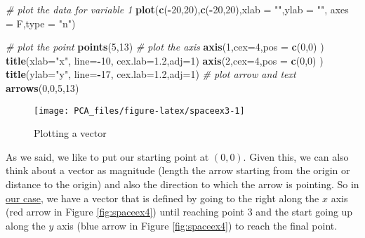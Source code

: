 \documentclass[
]{book}
\newenvironment{Shaded}{\begin{snugshade}}{\end{snugshade}}
\newcommand{\CommentTok}[1]{\textcolor[rgb]{0.56,0.35,0.01}{\textit{#1}}}
\newcommand{\DataTypeTok}[1]{\textcolor[rgb]{0.13,0.29,0.53}{#1}}
\newcommand{\DecValTok}[1]{\textcolor[rgb]{0.00,0.00,0.81}{#1}}
\newcommand{\FloatTok}[1]{\textcolor[rgb]{0.00,0.00,0.81}{#1}}
\newcommand{\KeywordTok}[1]{\textcolor[rgb]{0.13,0.29,0.53}{\textbf{#1}}}
\newcommand{\NormalTok}[1]{#1}
\newcommand{\OperatorTok}[1]{\textcolor[rgb]{0.81,0.36,0.00}{\textbf{#1}}}
\newcommand{\StringTok}[1]{\textcolor[rgb]{0.31,0.60,0.02}{#1}}
\theoremstyle{definition}
\theoremstyle{definition}
\theoremstyle{definition}
\theoremstyle{remark}
\begin{document}
\begin{Shaded}
\begin{Highlighting}[]
\CommentTok{# plot the data for variable 1}
\KeywordTok{plot}\NormalTok{(}\KeywordTok{c}\NormalTok{(}\OperatorTok{-}\DecValTok{20}\NormalTok{,}\DecValTok{20}\NormalTok{),}\KeywordTok{c}\NormalTok{(}\OperatorTok{-}\DecValTok{20}\NormalTok{,}\DecValTok{20}\NormalTok{),}\DataTypeTok{xlab =} \StringTok{""}\NormalTok{,}\DataTypeTok{ylab =} \StringTok{""}\NormalTok{,}
 \DataTypeTok{axes =}\NormalTok{ F,}\DataTypeTok{type =} \StringTok{"n"}\NormalTok{)}

\CommentTok{# plot the point}
\KeywordTok{points}\NormalTok{(}\DecValTok{5}\NormalTok{,}\DecValTok{13}\NormalTok{)}
\CommentTok{# plot the axis}
\KeywordTok{axis}\NormalTok{(}\DecValTok{1}\NormalTok{,}\DataTypeTok{cex=}\DecValTok{4}\NormalTok{,}\DataTypeTok{pos =} \KeywordTok{c}\NormalTok{(}\DecValTok{0}\NormalTok{,}\DecValTok{0}\NormalTok{) )}
\KeywordTok{title}\NormalTok{(}\DataTypeTok{xlab=}\StringTok{"x"}\NormalTok{, }\DataTypeTok{line=}\OperatorTok{-}\DecValTok{10}\NormalTok{, }\DataTypeTok{cex.lab=}\FloatTok{1.2}\NormalTok{,}\DataTypeTok{adj=}\DecValTok{1}\NormalTok{)}
\KeywordTok{axis}\NormalTok{(}\DecValTok{2}\NormalTok{,}\DataTypeTok{cex=}\DecValTok{4}\NormalTok{,}\DataTypeTok{pos =} \KeywordTok{c}\NormalTok{(}\DecValTok{0}\NormalTok{,}\DecValTok{0}\NormalTok{) )}
\KeywordTok{title}\NormalTok{(}\DataTypeTok{ylab=}\StringTok{"y"}\NormalTok{, }\DataTypeTok{line=}\OperatorTok{-}\DecValTok{17}\NormalTok{, }\DataTypeTok{cex.lab=}\FloatTok{1.2}\NormalTok{,}\DataTypeTok{adj=}\DecValTok{1}\NormalTok{)}
\CommentTok{# plot arrow and text}
\KeywordTok{arrows}\NormalTok{(}\DecValTok{0}\NormalTok{,}\DecValTok{0}\NormalTok{,}\DecValTok{5}\NormalTok{,}\DecValTok{13}\NormalTok{)}
\end{Highlighting}
\end{Shaded}

\begin{figure}

{\centering \texttt{[image: PCA\_files/figure-latex/spaceex3-1]} 

}

\caption{Plotting a vector}\label{fig:spaceex3}
\end{figure}

As we said, we like to put our starting point at \((0,0)\). Given this, we can also think about a vector as magnitude (length the arrow starting from the origin or distance to the origin) and also the direction to which the arrow is pointing.
So in \protect\hyperlink{spaceex3}{our case}, we have a vector that is defined by going to the right along the \(x\) axis (red arrow in Figure \ref{fig:spaceex4}) until reaching point 3 and the start going up along the \(y\) axis (blue arrow in Figure \ref{fig:spaceex4}) to reach the final point.
\end{document}
